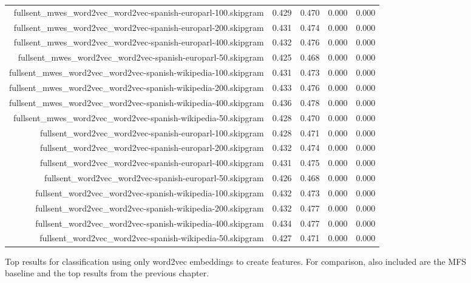 \begin{figure*}
\begin{centering}
\begin{tabulary}{\textwidth}{|R|L|L|L|L|}
fullsent_mwes_word2vec_word2vec-spanish-europarl-100.skipgram & 0.429 & 0.470 & 0.000 & 0.000 \\
fullsent_mwes_word2vec_word2vec-spanish-europarl-200.skipgram & 0.431 & 0.474 & 0.000 & 0.000 \\
fullsent_mwes_word2vec_word2vec-spanish-europarl-400.skipgram & 0.432 & 0.476 & 0.000 & 0.000 \\
fullsent_mwes_word2vec_word2vec-spanish-europarl-50.skipgram & 0.425 & 0.468 & 0.000 & 0.000 \\
fullsent_mwes_word2vec_word2vec-spanish-wikipedia-100.skipgram & 0.431 & 0.473 & 0.000 & 0.000 \\
fullsent_mwes_word2vec_word2vec-spanish-wikipedia-200.skipgram & 0.433 & 0.476 & 0.000 & 0.000 \\
fullsent_mwes_word2vec_word2vec-spanish-wikipedia-400.skipgram & 0.436 & 0.478 & 0.000 & 0.000 \\
fullsent_mwes_word2vec_word2vec-spanish-wikipedia-50.skipgram & 0.428 & 0.470 & 0.000 & 0.000 \\
fullsent_word2vec_word2vec-spanish-europarl-100.skipgram & 0.428 & 0.471 & 0.000 & 0.000 \\
fullsent_word2vec_word2vec-spanish-europarl-200.skipgram & 0.432 & 0.474 & 0.000 & 0.000 \\
fullsent_word2vec_word2vec-spanish-europarl-400.skipgram & 0.431 & 0.475 & 0.000 & 0.000 \\
fullsent_word2vec_word2vec-spanish-europarl-50.skipgram & 0.426 & 0.468 & 0.000 & 0.000 \\
fullsent_word2vec_word2vec-spanish-wikipedia-100.skipgram & 0.432 & 0.473 & 0.000 & 0.000 \\
fullsent_word2vec_word2vec-spanish-wikipedia-200.skipgram & 0.432 & 0.477 & 0.000 & 0.000 \\
fullsent_word2vec_word2vec-spanish-wikipedia-400.skipgram & 0.434 & 0.477 & 0.000 & 0.000 \\
fullsent_word2vec_word2vec-spanish-wikipedia-50.skipgram & 0.427 & 0.471 & 0.000 & 0.000 \\
    \hline
  \end{tabulary}
  \end{centering}
  \caption{Top results for classification using only word2vec embeddings to
  create features. For comparison, also included are the MFS baseline and the
  top results from the previous chapter.}
  \label{fig:word2vec-alone-results-skipgram}
\end{figure*}

